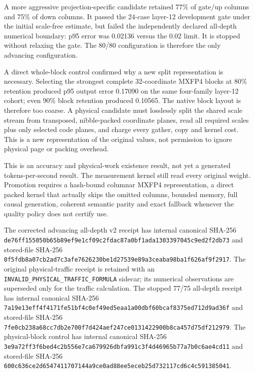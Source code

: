A more aggressive projection-specific candidate retained 77\% of gate/up
columns and 75\% of down columns.  It passed the 24-case layer-12 development
gate under the initial scale-free estimate, but failed the independently
declared all-depth numerical boundary: p95 error was 0.02136 versus the 0.02
limit.  It is stopped without relaxing the gate.  The 80/80 configuration is
therefore the only advancing configuration.

A direct whole-block control confirmed why a new split representation is
necessary.  Selecting the strongest complete 32-coordinate MXFP4 blocks at
80\% retention produced p95 output error 0.17090 on the same four-family
layer-12 cohort; even 90\% block retention produced 0.10565.  The native block
layout is therefore too coarse.  A physical candidate must losslessly split
the shared scale stream from transposed, nibble-packed coordinate planes, read
all required scales plus only selected code planes, and charge every gather,
copy and kernel cost.  This is a new representation of the original values,
not permission to ignore physical page or packing overhead.

This is an accuracy and physical-work existence result, not yet a generated
tokens-per-second result.  The measurement kernel still read every original
weight.  Promotion requires a hash-bound columnar MXFP4 representation, a
direct packed kernel that actually skips the omitted columns, bounded memory,
full causal generation, coherent semantic parity and exact fallback whenever
the quality policy does not certify use.

The corrected advancing all-depth v2 receipt has internal canonical SHA-256
\texttt{de76ff155050b65b89ef9e1cf09c2fdac87a0bf1ada1303397045c9ed2f2db73}
and stored-file SHA-256
\texttt{0f5fdb8a07cb2ad7c3afe7626230be1d27539e89a3ceaba98ba1f626af9f2917}.
The original physical-traffic receipt is retained with an
\texttt{INVALID\_PHYSICAL\_TRAFFIC\_FORMULA} sidecar; its numerical observations
are superseded only for the traffic calculation.
The stopped 77/75 all-depth receipt has internal canonical SHA-256
\texttt{7a19e13eff4f4171fe51bf4c0ef49ed5eaa1a00dbf60bcaf8375ed712d9ad36f}
and stored-file SHA-256
\texttt{7fe0cb238a68cc7db2e700f7d424aef247ce0131422900b8ca457d75df212979}.
The physical-block control has internal canonical SHA-256
\texttt{3e9a72ff3f6bed4c2b556e7ca679926dbfa991c3f4d46965b77a7b0c6ae4cd11}
and stored-file SHA-256
\texttt{600c636ce2d6547411707144a9ce0ad88ee5eceb25d732117cd6c4c591385041}.

